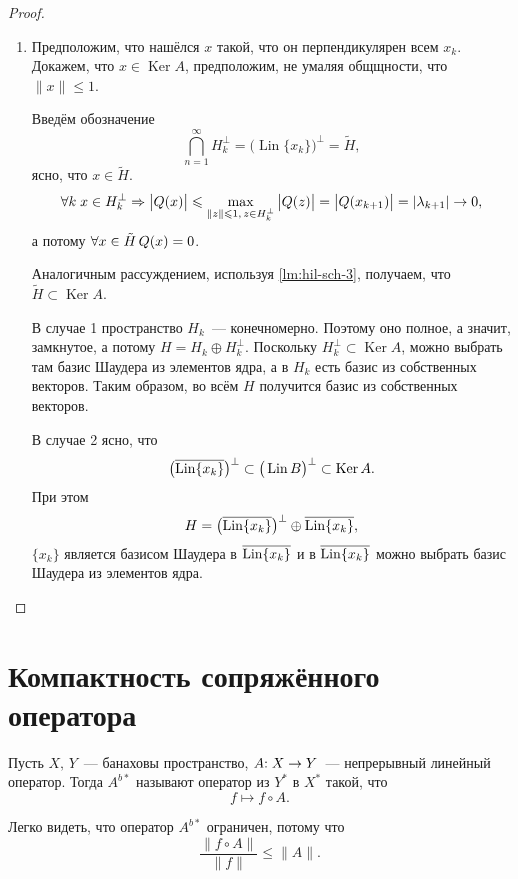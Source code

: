 \documentclass{notes}
\DeclareMathOperator{\Ker}{Ker}
\DeclareMathOperator{\Lin}{Lin}
\begin{document}
\begin{thm}
\begin{proof}
\begin{enumerate}
				\item Предположим, что нашёлся $x$ такой, что он перпендикулярен всем $x_k$. Докажем, что $x \in \Ker A$, предположим, не умаляя общщности, что $\|x\| \leqslant 1$.

				Введём обозначение
				\[
					\bigcap\limits_{n = 1}^{\infty} H_k^{\perp} = \big(\Lin \{x_k\}\big)^{\perp} = \tilde{H},
				\]
				ясно, что $x \in \tilde{H}$.
				\[
					\forall k \; x \in H_k^{\perp} \Rightarrow \big|Q(x)\big| \leqslant \max\limits_{\|z\| \leqslant 1, \, z \in H_k^{\perp}} \big|Q(z)\big| = \big|Q(x_{k + 1})\big| = |\lambda_{k + 1}| \to 0,
				\]
				а потому $\forall x \in \tilde{H} \, Q(x) = 0$.

				Аналогичным рассуждением, используя \ref{lm:hil-sch-3}, получаем, что $\tilde{H} \subset \Ker A$.

				В случае 1 пространство $H_k$~--- конечномерно. Поэтому оно полное, а значит, замкнутое, а потому $H = H_k \oplus H_k^{\perp}$. Поскольку $H_k^{\perp} \subset \Ker A$, можно выбрать там базис Шаудера из элементов ядра, а в $H_k$ есть базис из собственных векторов. Таким образом, во всём $H$ получится базис из собственных векторов.

				В случае 2 ясно, что
				\[
					\big(\ov{\Lin \{x_k\}}\big)^{\perp} \subset \big(\Lin B \big)^{\perp} \subset \Ker A.
				\]
				При этом 
				\[
					H = \big(\ov{\Lin \{x_k\}}\big)^{\perp} \oplus \ov{\Lin \{x_k\}},
				\]
				$\{x_k\}$ является базисом Шаудера в $\ov{\Lin \{x_k\}}$ и в $\ov{\Lin \{x_k\}}$ можно выбрать базис Шаудера из элементов ядра.
 			\end{enumerate}	
		\end{proof}
	\end{thm}

	\setcounter{subsection}{32}

\section{Компактность сопряжённого оператора}

	\begin{de}
		Пусть $X, \, Y$~--- банаховы пространство, $A\text{\text{:}} \; X \to Y$~--- непрерывный линейный оператор. Тогда  $A^{b*}$ называют оператор из $Y^*$ в $X^*$ такой, что
		\[
			f \mapsto f \circ A.
		\]
	\end{de}

	\begin{rem}
		Легко видеть, что оператор $A^{b*}$ ограничен, потому что
		\[
			\dfrac{\|f \circ A\|}{\|f\|} \leqslant \|A\|.
		\]
	\end{rem}
\end{document}
